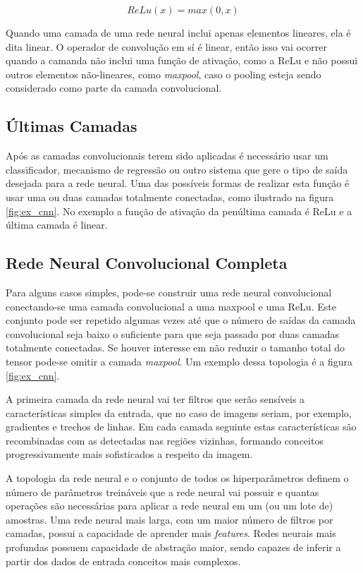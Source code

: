 \begin{equation}
	ReLu(x) = max(0,x)
\end{equation}

Quando uma camada de uma rede neural inclui apenas elementos lineares,
ela é dita linear. O operador de convolução em sí é linear, então
isso vai ocorrer quando a camanda não inclui uma função de ativação, como
a ReLu e não possui outros elementos não-lineares, como \emph{maxpool},
caso o pooling esteja sendo considerado como parte da camada convolucional.

\subsection{Últimas Camadas}
Após as camadas convolucionais terem sido aplicadas é necessário usar um
classificador, mecanismo de regressão ou outro sistema que gere o tipo de saída
desejada para a rede neural. Uma das possíveis formas de realizar esta função é
usar uma ou duas camadas totalmente conectadas, como ilustrado na figura
\ref{fig:ex_cnn}. No exemplo a função de ativação da penúltima camada é
ReLu e a última camada é linear.

\subsection{Rede Neural Convolucional Completa}
Para alguns casos simples, pode-se construir uma rede neural convolucional
conectando-se uma camada convolucional a uma maxpool e uma ReLu. Este conjunto
pode ser repetido algumas vezes até que o número de saídas da camada
convolucional seja baixo o suficiente para que seja passado por duas camadas
totalmente conectadas. Se houver interesse em não reduzir o tamanho total do
tensor pode-se omitir a camada \emph{maxpool}. Um exemplo dessa topologia é a
figura \ref{fig:ex_cnn}.

A primeira camada da rede neural vai ter filtros que serão sensíveis a
características simples da entrada, que no caso de imagens seriam, por exemplo,
gradientes e trechos de linhas. Em
cada camada seguinte estas características são recombinadas com as detectadas
nas regiões vizinhas, formando conceitos progressivamente mais sofisticados a
respeito da imagem.

A topologia da rede neural e o conjunto de todos os hiperparâmetros definem o
número de parâmetros treináveis que a rede neural vai possuir e quantas
operações são necessárias para aplicar a rede neural em um (ou um lote de)
amostras. Uma rede neural mais larga, com um maior número de filtros por
camadas, possui a capacidade de aprender mais \emph{features}. Redes neurais
mais profundas possuem capacidade de abstração maior, sendo capazes de inferir
a partir dos dados de entrada conceitos mais complexos.

